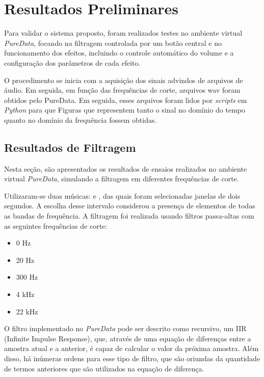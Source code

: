 \chapter[Resultados Preliminares]{Resultados Preliminares}
\label{sec:Resultados}

Para validar o sistema proposto, foram realizados testes no ambiente virtual \textit{PureData}, focando na filtragem controlada por um botão central e no funcionamento dos efeitos, incluindo o controle automático do volume e a configuração dos parâmetros de cada efeito.

O procedimento se inicia com a aquisição dos sinais advindos de arquivos de áudio. Em seguida, em função das frequências de corte, arquivos wav foram obtidos pelo PureData. Em seguida, esses arquivos foram lidos por \textit{scripts} em \textit{Python} para que Figuras que representem tanto o sinal no domínio do tempo quanto no domínio da frequência fossem obtidas. 

\section{Resultados de Filtragem}

Nesta seção, são apresentados os resultados de ensaios realizados no ambiente virtual \textit{PureData}, simulando a filtragem em diferentes frequências de corte.

Utilizaram-se duas músicas: \cite{track01} e \cite{track02}, das quais foram selecionadas janelas de dois segundos. A escolha desse intervalo considerou a presença de elementos de todas as bandas de frequência. A filtragem foi realizada usando filtros passa-altas com as seguintes frequências de corte:

\begin{itemize}
    \item 0 Hz
    \item 20 Hz
    \item 300 Hz
    \item 4 kHz
    \item 22 kHz
\end{itemize}

O filtro implementado no \textit{PureData} pode ser descrito como recursivo, um IIR (Infinite Impulse Response), que, através de uma equação de diferenças entre a amostra atual e a anterior, é capaz de calcular o valor da próxima amostra. Além disso, há inúmeras ordens para esse tipo de filtro, que são oriundas da quantidade de termos anteriores que são utilizados na equação de diferença.

